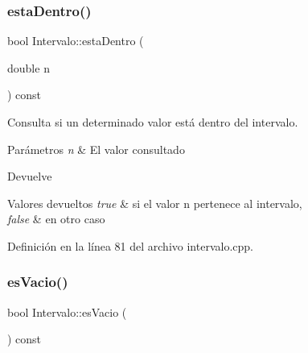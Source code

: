 \subsubsection{\texorpdfstring{estaDentro()}{estaDentro()}}
{\footnotesize\ttfamily bool Intervalo\+::esta\+Dentro (\begin{DoxyParamCaption}\item[{double}]{n }\end{DoxyParamCaption}) const}



Consulta si un determinado valor está dentro del intervalo. 


\begin{DoxyParams}{Parámetros}
{\em n} & El valor consultado \\
\hline
\end{DoxyParams}
\begin{DoxyReturn}{Devuelve}

\end{DoxyReturn}

\begin{DoxyRetVals}{Valores devueltos}
{\em true} & si el valor {\ttfamily n} pertenece al intervalo,\\
\hline
{\em false} & en otro caso \\
\hline
\end{DoxyRetVals}


Definición en la línea 81 del archivo intervalo.\+cpp.


\begin{DoxyCode}{0}

\end{DoxyCode}
\mbox{\label{classIntervalo_adc77e18147f9f9f85476a0d44257bb02}} 
\subsubsection{\texorpdfstring{esVacio()}{esVacio()}}
{\footnotesize\ttfamily bool Intervalo\+::es\+Vacio (\begin{DoxyParamCaption}{ }\end{DoxyParamCaption}) const}



